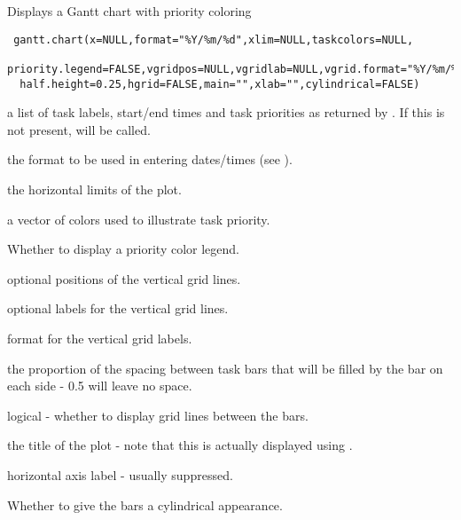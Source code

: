 \begin{Description}\relax
Displays a Gantt chart with priority coloring
\end{Description}
\begin{Usage}
\begin{verbatim}
 gantt.chart(x=NULL,format="%Y/%m/%d",xlim=NULL,taskcolors=NULL,
  priority.legend=FALSE,vgridpos=NULL,vgridlab=NULL,vgrid.format="%Y/%m/%d",
  half.height=0.25,hgrid=FALSE,main="",xlab="",cylindrical=FALSE)
\end{verbatim}
\end{Usage}
\begin{Arguments}
\begin{ldescription}
\item[\code{x}] a list of task labels, start/end times and task priorities
as returned by . If this is not present,
 will be called.
\item[\code{format}] the format to be used in entering dates/times
(see ).
\item[\code{xlim}] the horizontal limits of the plot.
\item[\code{taskcolors}] a vector of colors used to illustrate task priority.
\item[\code{priority.legend}] Whether to display a priority color legend.
\item[\code{vgridpos}] optional positions of the vertical grid lines.
\item[\code{vgridlab}] optional labels for the vertical grid lines.
\item[\code{vgrid.format}] format for the vertical grid labels.
\item[\code{half.height}] the proportion of the spacing between task bars that
will be filled by the bar on each side - 0.5 will leave no space.
\item[\code{hgrid}] logical - whether to display grid lines between the bars.
\item[\code{main}] the title of the plot - note that this is actually displayed
using .
\item[\code{xlab}] horizontal axis label - usually suppressed.
\item[\code{cylindrical}] Whether to give the bars a cylindrical appearance.
\end{ldescription}
\end{Arguments}
